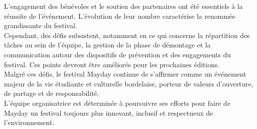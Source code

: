 \documentclass[12pt,a4paper]{report}
\begin{document}
L’engagement des bénévoles et le soutien des partenaires ont été essentiels à la réussite de l’événement. L'évolution de leur nombre caractérise la renommée grandissante du festival.\\ 

Cependant, des défis subsistent, notamment en ce qui concerne la répartition des tâches au sein de l’équipe, la gestion de la phase de démontage et la communication autour des dispositifs de prévention et des engagements du festival. Ces points devront être améliorés pour les prochaines éditions.\\

Malgré ces défis, le festival Mayday continue de s’affirmer comme un événement majeur de la vie étudiante et culturelle bordelaise, porteur de valeurs d’ouverture, de partage et de responsabilité.\\

L’équipe organisatrice est déterminée à poursuivre ses efforts pour faire de Mayday un festival toujours plus innovant, inclusif et respectueux de l’environnement.

\listoftables
\end{document}

